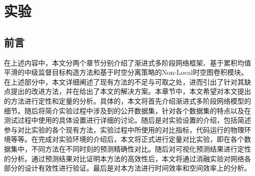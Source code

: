\chapter{实验}
\section{前言}
在上述内容中，本文分两个章节分别介绍了渐进式多阶段网络框架、基于累积均值平滑的中级监督目标构造方法和基于时空分离策略的Non-Local时空图卷积模块。在上述部分中，本文详细阐述了现有方法的不足与可取之处，进而引出了针对其缺点提出的改进方法，并在给出了本文的解决方案。本章节中，本文希望对本文提出的方法进行定性和定量的分析。具体的，本文将首先介绍渐进式多阶段网络模型的细节。随后将简介实验过程中涉及到的公开数据集，针对各个数据集的特点以及在测试过程中使用的具体设置进行详细的讨论。随后是对实验设置的介绍，包括简述参与对比实验的各个现有方法，实验过程中所使用的对比指标，代码运行的物理环境等等。在完成对实验环境的介绍后，本文将正式进行定量对比实验，即在各个数据集中，不同方法在不同时刻的预测精确性对比。随后对可视化预测结果进行定性的分析。通过预测结果对比证明本方法的高效性后，本文将通过消融实验对网络各部分的设计有效性进行验证。最后是对本方法进行时间效率和空间效率上的分析。

